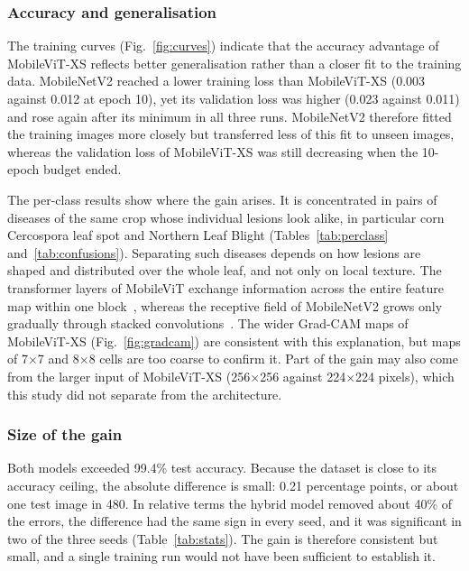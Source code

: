 \documentclass[conference]{IEEEtran}
\begin{document}
\subsubsection{Accuracy and generalisation}
The training curves (Fig.~\ref{fig:curves}) indicate that the accuracy advantage of MobileViT-XS reflects better generalisation rather than a closer fit to the training data. MobileNetV2 reached a lower training loss than MobileViT-XS (0.003 against 0.012 at epoch 10), yet its validation loss was higher (0.023 against 0.011) and rose again after its minimum in all three runs. MobileNetV2 therefore fitted the training images more closely but transferred less of this fit to unseen images, whereas the validation loss of MobileViT-XS was still decreasing when the 10-epoch budget ended.

The per-class results show where the gain arises. It is concentrated in pairs of diseases of the same crop whose individual lesions look alike, in particular corn Cercospora leaf spot and Northern Leaf Blight (Tables~\ref{tab:perclass} and~\ref{tab:confusions}). Separating such diseases depends on how lesions are shaped and distributed over the whole leaf, and not only on local texture. The transformer layers of MobileViT exchange information across the entire feature map within one block~\cite{mehta2022mobilevit}, whereas the receptive field of MobileNetV2 grows only gradually through stacked convolutions~\cite{sandler2018mobilenetv2}. The wider Grad-CAM maps of MobileViT-XS (Fig.~\ref{fig:gradcam}) are consistent with this explanation, but maps of 7$\times$7 and 8$\times$8 cells are too coarse to confirm it. Part of the gain may also come from the larger input of MobileViT-XS (256$\times$256 against 224$\times$224 pixels), which this study did not separate from the architecture.

\subsubsection{Size of the gain}
Both models exceeded 99.4\% test accuracy. Because the dataset is close to its accuracy ceiling, the absolute difference is small: 0.21 percentage points, or about one test image in 480. In relative terms the hybrid model removed about 40\% of the errors, the difference had the same sign in every seed, and it was significant in two of the three seeds (Table~\ref{tab:stats}). The gain is therefore consistent but small, and a single training run would not have been sufficient to establish it.
\end{document}

